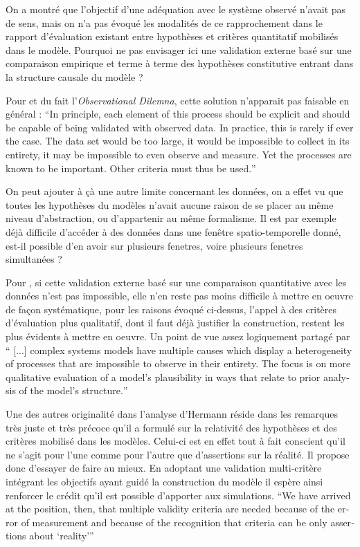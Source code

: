 On a montré que l'objectif d'une adéquation avec le système observé n'avait pas de sens, mais on n'a pas évoqué les modalités de ce rapprochement dans le rapport d'évaluation existant entre hypothèses et critères quantitatif mobilisés dans le modèle. Pourquoi ne pas envisager ici une validation externe basé sur une comparaison empirique et terme à terme des hypothèses constitutive entrant dans la structure causale du modèle ?

Pour \textcite{Batty2001} et du fait l'\textit{Observational Dilemna}, cette solution n'apparait pas faisable en général : \foreignquote{english}{In principle, each element of this process should be explicit and should be capable of being validated with observed data. In practice, this is rarely if ever the case. The data set would be too large, it would be impossible to collect in its entirety, it may be impossible to even observe and measure. Yet the processes are known to be important. Other criteria must thus be used.} 

On peut ajouter à çà une autre limite concernant les données, on a effet vu que toutes les hypothèses du modèles n'avait aucune raison de se placer au même niveau d'abstraction, ou d'appartenir au même formalisme. Il est par exemple déjà difficile d'accéder à des données dans une fenêtre spatio-temporelle donné, est-il possible d'en avoir sur plusieurs fenetres, voire plusieurs fenetres simultanées ? 

Pour \autocite{Amblard2006}, si cette validation externe basé sur une comparaison quantitative avec les données n'est pas impossible, elle n'en reste pas moins difficile à mettre en oeuvre de façon systématique, pour les raisons évoqué ci-dessus, l'appel à des critères d'évaluation plus qualitatif, dont il faut déjà justifier la construction, restent les plus évidents à mettre en oeuvre. Un point de vue assez logiquement partagé par \textcite{Batty2001} \foreignquote{english}{ [...] complex systems models have multiple causes which display a heterogeneity of processes that are impossible to observe in their entirety. The focus is on more qualitative evaluation of a model’s plausibility in ways that relate to prior analysis of the model’s structure.} 


Une des autres originalité dans l'analyse d'Hermann réside dans les remarques très juste et très précoce qu'il a formulé sur la relativité des hypothèses et des critères mobilisé dans les modèles. Celui-ci est en effet tout à fait conscient qu'il ne s'agit pour l'une comme pour l'autre que d'assertions sur la réalité. Il propose donc d'essayer de faire au mieux. En adoptant une validation multi-critère  intégrant les objectifs ayant guidé la construction du modèle il espère ainsi renforcer le crédit qu'il est possible d'apporter aux simulations. \foreignquote{english}{We have arrived at the position, then, that multiple validity criteria are needed because of the error of measurement and because of the recognition that criteria can be only assertions about \enquote{reality}} 

